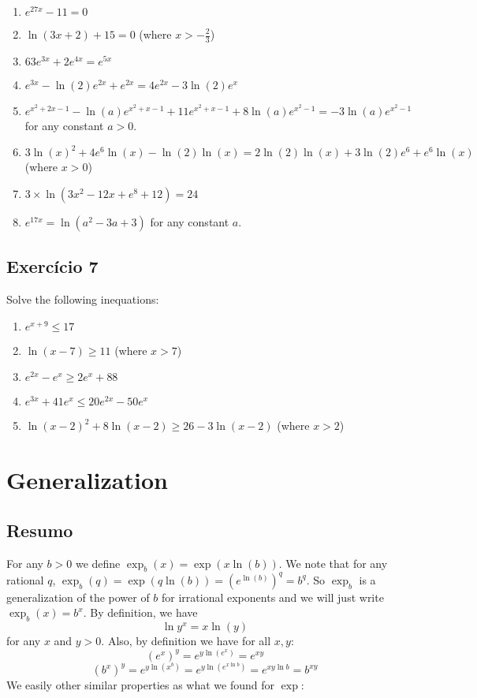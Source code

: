 \begin{enumerate}
\item $e^{27x} - 11 = 0$
\item $\ln{(3x+2)} + 15 = 0$ (where $x > -\frac{2}{3}$)
\item $63e^{3x} + 2e^{4x} = e^{5x}$
\item $e^{3x} - \ln{(2)} e^{2x} + e^{2x} = 4e^{2x} - 3 \ln{(2)} e^x$
\item $e^{x^2+2x-1} - \ln{(a)}e^{x^2+x-1} + 11e^{x^2+x-1}+8\ln{(a)}e^{x^2-1} =
  -3\ln{(a)}e^{x^2-1}$ for any constant $a > 0$.
\item $3{\ln{(x)}}^2 + 4e^6{\ln{(x)}}
  - \ln{(2)}\ln{(x)}  = 2\ln{(2)}\ln{(x)} + 3\ln{(2)} e^6 + e^6{\ln{(x)}}$
  (where $x > 0$)
\item $3 \times \ln{(3x^2 -12x + e^8 + 12)} = 24$
\item $e^{17x} = \ln{\left(a^2-3a+3\right)}$ for any constant $a$.
\end{enumerate}

\subsection*{Exercício 7}

Solve the following inequations:

\begin{enumerate}
\item $e^{x+9} \leq 17$
\item $\ln{(x-7)} \geq 11$ (where $x > 7$)
\item $e^{2x} - e^{x} \geq 2e^{x} + 88$
\item $e^{3x} + 41e^x \leq 20 e^{2x} -50e^x$
\item $\ln{(x-2)}^2 +8\ln{(x-2)} \geq 26 - 3\ln{(x-2)}$ (where $x > 2$)
\end{enumerate}

\section{Generalization}

\subsection*{Resumo}

For any $b > 0$ we define
$\exp_b{(x)} = \exp{(x \ln{(b)})}$. We note that for any rational $q$,
$\exp_{b}{(q)} = \exp{(q \ln{(b)})} = {(e^{\ln{(b)}})}^q = b^q$. So $\exp_b$ is
a generalization of the power of $b$ for irrational exponents and we will
just write $\exp_b{(x)} = b^x$. By definition, we have
%
$$\ln{y^x} = x \ln{(y)}$$
%
for any $x$ and $y > 0$.
Also, by definition we have for all $x,y$:
%
$${\left(e^{x}\right)}^y = e^{y \ln{(e^x)}} = e^{xy}$$
$${\left(b^{x}\right)}^y = e^{y \ln{(x^b)}} = e^{y \ln{(e^{x \ln{b}})}} =
e^{xy \ln{b}} = b^{xy}$$
%
We easily other similar properties as what we found for $\exp$:

